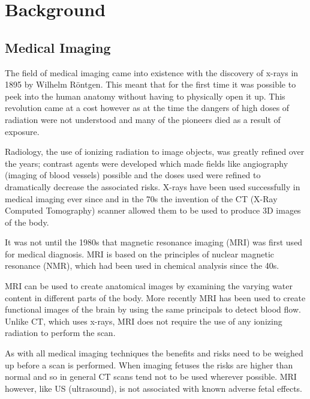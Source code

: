 \chapter{Background}

\section{Medical Imaging}\label{background:medicalimaging}
The field of medical imaging came into existence with the discovery of x-rays in 1895 by Wilhelm R\"{o}ntgen\cite{rontgen}. This meant that for the first time it was possible to peek into the human anatomy without having to physically open it up. This revolution came at a cost however as at the time the dangers of high doses of radiation were not understood and many of the pioneers died as a result of exposure\cite{xraydeath}.

Radiology, the use of ionizing radiation to image objects, was greatly refined over the years; contrast agents were developed which made fields like angiography (imaging of blood vessels) possible\cite{infinityhistory} and the doses used were refined to dramatically decrease the associated risks. X-rays have been used successfully in medical imaging ever since and in the 70s the invention of the CT (X-Ray Computed Tomography) scanner allowed them to be used to produce 3D images of the body.

It was not until the 1980s that magnetic resonance imaging (MRI) was first used for medical diagnosis. MRI is based on the principles of nuclear magnetic resonance (NMR), which had been used in chemical analysis since the 40s\cite{bshr:mallard}.

MRI can be used to create anatomical images by examining the varying water content in different parts of the body. More recently MRI has been used to create functional images of the brain by using the same principals to detect blood flow\cite{fmri}. Unlike CT, which uses x-rays, MRI does not require the use of any ionizing radiation to perform the scan.

As with all medical imaging techniques the benefits and risks need to be weighed up before a scan is performed. When imaging fetuses the risks are higher than normal and so in general CT scans tend not to be used wherever possible. MRI however, like US (ultrasound), is not associated with known adverse fetal effects\cite{pregnancyimagingguidelines}.


